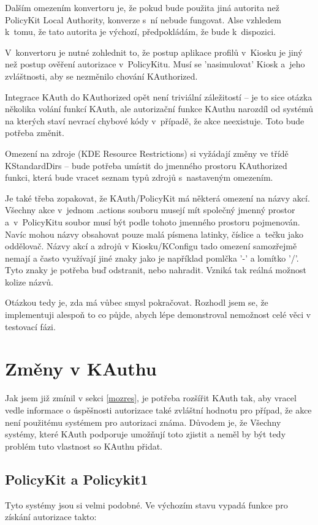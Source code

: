Dalším omezením konvertoru je, že pokud bude použita jiná autorita než PolicyKit
Local Authority, konverze s~ní nebude fungovat. Alse vzhledem k~tomu, že tato
autorita je výchozí, předpokládám, že bude k~dispozici.

V~konvertoru je nutné zohlednit to, že postup aplikace profilů v~Kiosku je jiný
než postup ověření autorizace v~PolicyKitu. Musí se 'nasimulovat' Kiosk a~jeho
zvláštnosti, aby se nezměnilo chování KAuthorized.

Integrace KAuth do KAuthorized opět není triviální záležitostí -- je to sice
otázka několika volání funkcí KAuth, ale autorizační funkce KAuthu narozdíl
od systémů na kterých staví nevrací chybové kódy v~případě, že akce neexistuje.
Toto bude potřeba změnit.

Omezení na zdroje (KDE Resource Restrictions) si vyžádají změny ve třídě
KStandardDirs -- bude potřeba umístit do jmenného prostoru KAuthorized funkci,
která bude vracet seznam typů zdrojů s~nastaveným omezením.

Je také třeba zopakovat, že KAuth/PolicyKit má některá omezení na názvy akcí.
Všechny akce v~jednom .actions souboru musejí mít společný jmenný prostor
a~v~PolicyKitu soubor musí být podle tohoto jmenného prostoru pojmenován.
Navíc mohou názvy obsahovat pouze malá písmena latinky, číslice a~tečku jako
oddělovač. Názvy akcí a zdrojů v Kiosku/KConfigu tado omezení samozřejmě nemají
a často využívají jiné znaky jako je například pomlčka '-' a lomítko '/'. Tyto
znaky je potřeba buď odstranit, nebo nahradit. Vzniká tak reálná možnost kolize
názvů.

Otázkou tedy je, zda má vůbec smysl pokračovat. Rozhodl jsem se, že implementuji
alespoň to co půjde, abych lépe demonstroval nemožnost celé věci v testovací
fázi.
\section{Změny v KAuthu}
Jak jsem již zmínil v sekci \ref{mozres}, je potřeba rozšířit KAuth tak, aby
vracel vedle informace o úspěšnosti autorizace také zvláštní hodnotu pro případ,
že akce není použitému systémem pro autorizaci známa. Důvodem je, že 
Všechny systémy, které
KAuth podporuje umožňují toto zjistit a neměl by být tedy problém tuto vlastnost
so KAuthu přidat.
\subsection{PolicyKit a Policykit1}
Tyto systémy jsou si velmi podobné. Ve výchozím stavu vypadá funkce pro získání
autorizace takto:

